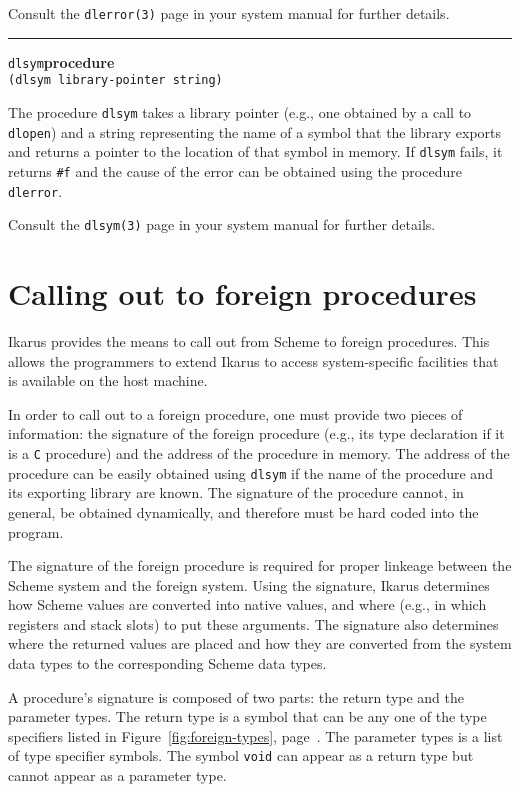 \documentclass[onecolumn, 12pt, twoside, openright, dvipdfm]{book}
\makeatletter
\newcommand{\idxlabeldefun}[5]{
\vspace{1ex}
\rule{\textwidth}{2pt}
{\phantomsection\index{#1@\texttt{#2}}\label{#3}{\Large\texttt{#4}}\hfill\textbf{#5}}\\}
\newcommand{\idxdefun}[3]{\idxlabeldefun{#1}{#2}{#1}{#2}{#3}}
\newcommand{\defun}[2]{\idxdefun{#1}{#1}{#2}}
\makeatother
\begin{document}
Consult the \texttt{dlerror(3)} page in your system manual for
further details.

\defun{dlsym}{procedure}
\texttt{(dlsym library-pointer string)}

The procedure \texttt{dlsym} takes a library pointer (e.g., one
obtained by a call to \texttt{dlopen}) and a string representing the
name of a symbol that the library exports and returns a pointer to
the location of that symbol in memory.  If \texttt{dlsym} fails, it
returns \texttt{\#f} and the cause of the error can be obtained
using the procedure \texttt{dlerror}.

Consult the \texttt{dlsym(3)} page in your system manual for
further details.


\section{\label{sec:callout}Calling out to foreign procedures}

Ikarus provides the means to call out from Scheme to foreign
procedures.  This allows the programmers to extend Ikarus to access
system-specific facilities that is available on the host machine.  

In order to call out to a foreign procedure, one must provide two
pieces of information: the signature of the foreign procedure (e.g.,
its type declaration if it is a \texttt{C} procedure) and the
address of the procedure in memory.  The address of the procedure
can be easily obtained using \texttt{dlsym} if the name of the
procedure and its exporting library are known.  The signature of the
procedure cannot, in general, be obtained dynamically, and therefore
must be hard coded into the program.

The signature of the foreign procedure is required for proper
linkeage between the Scheme system and the foreign system.  Using
the signature, Ikarus determines how Scheme values are converted
into native values, and where (e.g., in which registers and stack
slots) to put these arguments.  The signature also determines where
the returned values are placed and how they are converted from the
system data types to the corresponding Scheme data types.

A procedure's signature is composed of two parts: the return type
and the parameter types.  The return type is a symbol that can be
any one of the type specifiers listed in
Figure~\ref{fig:foreign-types}, page~\pageref{fig:foreign-types}.
The parameter types is a list of type specifier symbols.  The symbol
\texttt{void} can appear as a return type but cannot appear as a
parameter type.
\end{document}
